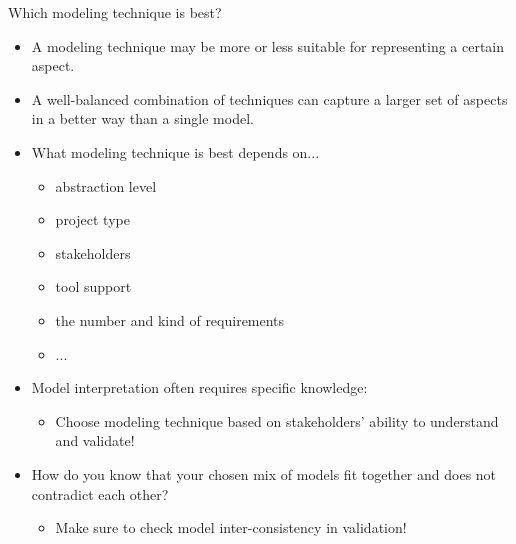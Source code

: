 
\begin{Slide}{Which modeling technique is best? }

\begin{itemize}
\item A modeling technique may be more or less suitable for  representing a certain aspect.

\item A well-balanced combination of techniques can capture a larger set of aspects in a better way than a single model.

\item What modeling technique is best depends on...
\begin{itemize}
\item abstraction level
\item project type
\item stakeholders
\item tool support
\item the number and kind of requirements
\item ...

\end{itemize}
\item Model interpretation often requires specific knowledge: 
\begin{itemize}
\item Choose modeling technique based on stakeholders' ability to understand and validate!

\end{itemize}
\item How do you know that your chosen mix of models fit together and does not contradict each other?
\begin{itemize}
\item Make sure to check model inter-consistency in validation!

\end{itemize}
\end{itemize}
\end{Slide}
